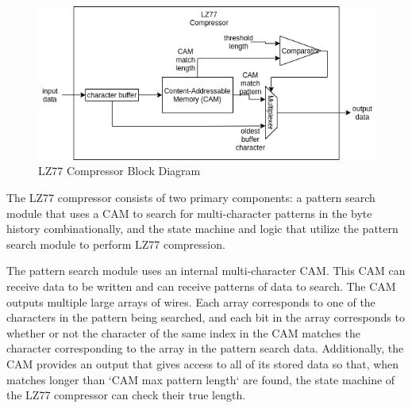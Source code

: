 \documentclass[doublespace,nopageskip]{VTthesis}
\begin{document}
\begin{figure}[htb]
	\centering
	\includegraphics[scale=0.8]{LZ77 Compressor.png}
	\caption{LZ77 Compressor Block Diagram}
	\label{fig:lz77_compressor_block_diagram}
\end{figure}

The LZ77 compressor consists of two primary components: a pattern search module that uses a CAM to search for multi-character patterns in the byte history combinationally, and the state machine and logic that utilize the pattern search module to perform LZ77 compression.

The pattern search module uses an internal multi-character CAM. This CAM can receive data to be written and can receive patterns of data to search. The CAM outputs multiple large arrays of wires. Each array corresponds to one of the characters in the pattern being searched, and each bit in the array corresponds to whether or not the character of the same index in the CAM matches the character corresponding to the array in the pattern search data. Additionally, the CAM provides an output that gives access to all of its stored data so that, when matches longer than `CAM max pattern length` are found, the state machine of the LZ77 compressor can check their true length.
\end{document}

